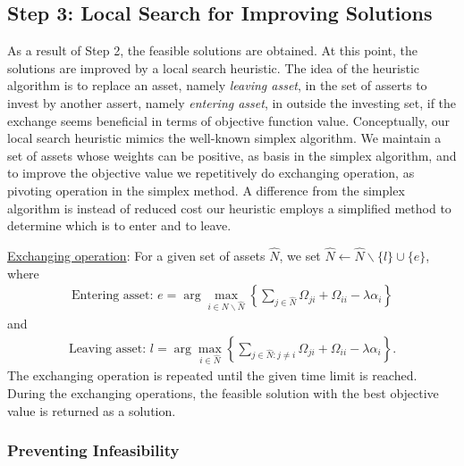 \documentclass[11pt]{article}
\begin{document}
	
	
	\subsection{Step 3: Local Search for Improving Solutions}
	
	As a result of Step 2, the feasible solutions are obtained. At this point, the solutions are improved by a local search heuristic. The idea of the heuristic algorithm is to replace an asset, namely \emph{leaving asset}, in the set of asserts to invest by another assert, namely \emph{entering asset}, in outside the investing set, if the exchange seems beneficial in terms of objective function value. Conceptually, our local search heuristic mimics the well-known simplex algorithm. We maintain a set of assets whose weights can be positive, as basis in the simplex algorithm, and to improve the objective value we repetitively do exchanging operation, as pivoting operation in the simplex method. A difference from the simplex algorithm is instead of reduced cost our heuristic employs a simplified method to determine which is to enter and to leave. 
	
	\underline{Exchanging operation}: For a given set of assets $\hat{N}$, we set $\hat{N} \gets \hat{N} \backslash \{l\} \cup \{e\}$, where
	\begin{align}
	\text{Entering asset: } e = \arg\max_{i \in N \backslash \hat{N}} \left\{ \sum_{j \in \hat{N}} \Omega_{ji} + \Omega_{ii} - \lambda \alpha_i \right\} \label{eq:entering}
	\end{align}
	and
	\begin{align}
	\text{Leaving asset: } l = \arg\max_{i \in \hat{N}} \left\{ \sum_{j \in \hat{N} : j \neq i} \Omega_{ji} + \Omega_{ii} - \lambda \alpha_i \right\}. \label{eq:leaving}
	\end{align}
	The exchanging operation is repeated until the given time limit is reached. During the exchanging operations, the feasible solution with the best objective value is returned as a solution. 
	
	\subsubsection{Preventing Infeasibility}
	
\end{document}
